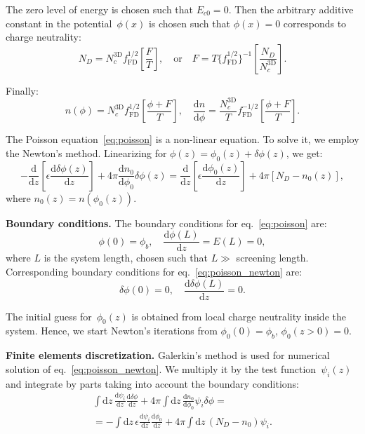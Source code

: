 \documentclass[10pt]{article}
\newcommand{\dd}{\mathrm{d}}
\newcommand{\fFD}{f_{\mathrm{FD}}}
\begin{document}
The zero level of energy is chosen such that $E_{c0} = 0$. Then the arbitrary additive
constant in the potential~$\phi(x)$ is chosen such that $\phi(x) = 0$ corresponds to
charge neutrality:
\begin{equation}
	N_D = N_c^\mathrm{3D} \fFD^{1/2} \left[ \frac{F}{T} \right],
	\quad\text{or}\quad
	F = T \{\fFD^{1/2}\}^{-1} \left[ \frac{N_D}{N_c^\mathrm{3D}} \right].
\end{equation}

Finally:
\begin{equation}
	n(\phi) = N_c^\mathrm{3D} \fFD^{1/2} \left[ \frac{\phi + F}{T} \right], \quad
	\frac{\dd n}{\dd \phi} =
		\frac{N_c^\mathrm{3D}}{T} \fFD^{-1/2} \left[ \frac{\phi + F}{T} \right].
\end{equation}

The Poisson equation~\eqref{eq:poisson} is a non-linear equation. To solve it, we employ
the Newton's method. Linearizing for $\phi(z) = \phi_0(z) + \delta\phi(z)$, we get:
\begin{equation}
	\label{eq:poisson_newton}
	- \frac{\dd}{\dd z} \left[ \epsilon \frac{\dd \delta\phi(z)}{\dd z} \right]
	+ 4\pi \frac{\dd n_0}{\dd \phi_0} \delta\phi(z)
	= \frac{\dd}{\dd z} \left[ \epsilon \frac{\dd \phi_0(z)}{\dd z} \right]
	+ 4\pi [N_D - n_0(z)],
\end{equation}
where $n_0(z) = n(\phi_0(z))$.

\textbf{Boundary conditions.} The boundary conditions for eq.~\eqref{eq:poisson} are:
\begin{equation}
	\phi(0) = \phi_b, \quad \frac{\dd \phi(L)}{\dd z} = E(L) = 0,
\end{equation}
where $L$ is the system length, chosen such that $L \gg$ screening length. Corresponding
boundary conditions for eq.~\eqref{eq:poisson_newton} are:
\begin{equation}
	\delta\phi(0) = 0, \quad \frac{\dd \delta\phi(L)}{\dd z} = 0.
\end{equation}

The initial guess for~$\phi_0(z)$ is obtained from local charge neutrality inside the
system. Hence, we start Newton's iterations from $\phi_0(0) = \phi_b$, $\phi_0(z > 0) = 0$.

\textbf{Finite elements discretization.} Galerkin's method is used for numerical solution
of eq.~\eqref{eq:poisson_newton}. We multiply it by the test function~$\psi_i(z)$ and
integrate by parts taking into account the boundary conditions:
\begin{multline}
	\int \dd z \, \frac{\dd \psi_i}{\dd z} \frac{\dd \delta\phi}{\dd z}
	+ 4\pi \int \dd z \, \frac{\dd n_0}{\dd \phi_0} \psi_i \delta\phi = \\
	= - \int \dd z \, \epsilon \frac{\dd \psi_i}{\dd z} \frac{\dd \phi_0}{\dd z}
	+ 4\pi \int \dd z \, (N_D - n_0) \psi_i.
\end{multline}
\end{document}

